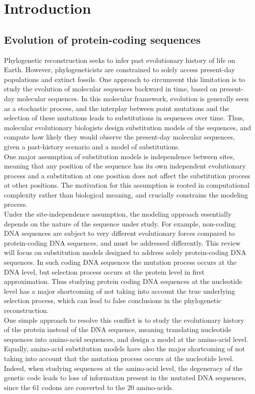 \chapter{Introduction}
\label{sec:intro}

\section{Evolution of protein-coding sequences}
Phylogenetic reconstruction seeks to infer past evolutionary history of life on Earth.
However, phylogeneticists are constrained to solely access present-day populations and extinct fossils.
One approach to circumvent this limitation is to study the evolution of molecular sequences backward in time, based on present-day molecular sequences.
In this molecular framework, evolution is generally seen as a stochastic process, and the interplay between point mutations and the selection of these mutations leads to substitutions in sequences over time.
Thus, molecular evolutionary biologists design substitution models of the sequences, and compute how likely they would observe the present-day molecular sequences, given a past-history scenario and a model of substitutions.\\
One major assumption of substitution models is independence between sites, meaning that any position of the sequence has its own independent evolutionary process and a substitution at one position does not affect the substitution process at other positions.
The motivation for this assumption is rooted in computational complexity rather than biological meaning, and crucially constrains the modeling process.\\
Under the site-independence assumption, the modeling approach essentially depends on the nature of the sequence under study.
For example, non-coding DNA sequences are subject to very different evolutionary forces compared to protein-coding DNA sequences, and must be addressed differently.
This review will focus on substitution models designed to address solely protein-coding DNA sequences.
In such coding DNA sequences the mutation process occurs at the DNA level, but selection process occurs at the protein level in first approximation.
Thus studying protein coding DNA sequences at the nucleotide level has a major shortcoming of not taking into account the true underlying selection process, which can lead to false conclusions in the phylogenetic reconstruction.\\
One simple approach to resolve this conflict is to study the evolutionary history of the protein instead of the DNA sequence, meaning translating nucleotide sequences into amino-acid sequences, and design a model at the amino-acid level.
Equally, amino-acid substitution models have also the major shortcoming of not taking into account that the mutation process occurs at the nucleotide level.
Indeed, when studying sequences at the amino-acid level, the degeneracy of the genetic code leads to loss of information present in the mutated DNA sequences, since the 61 codons are converted to the 20 amino-acids.\\

